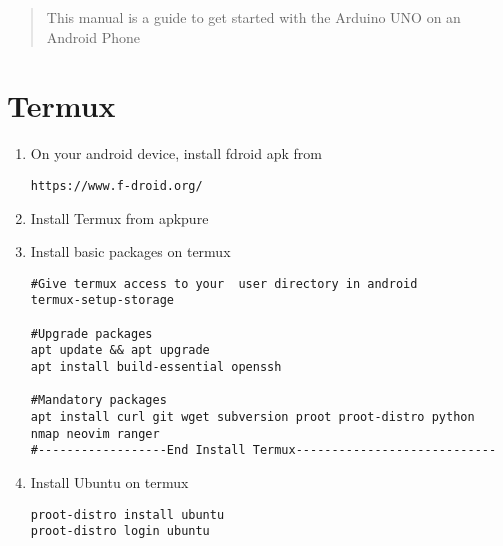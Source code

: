 \documentclass[journal,2pt,twocolumn]{IEEEtran}
\begin{document}
\tableofcontents

\bigskip

\begin{abstract}
This manual is a guide to get started with the Arduino UNO on an Android Phone
\end{abstract}




%
\fi

\section{Termux}
\begin{enumerate}
	\item On your android device, install 
fdroid apk from
%
\begin{lstlisting}
https://www.f-droid.org/
\end{lstlisting}
\item Install Termux from apkpure
\item Install basic packages on termux 
\begin{lstlisting}
#Give termux access to your  user directory in android
termux-setup-storage

#Upgrade packages
apt update && apt upgrade
apt install build-essential openssh

#Mandatory packages
apt install curl git wget subversion proot proot-distro python  nmap neovim ranger
#------------------End Install Termux----------------------------
\end{lstlisting}
\item Install Ubuntu on termux 
\begin{lstlisting}
proot-distro install ubuntu
proot-distro login ubuntu
\end{lstlisting}
\end{enumerate}
\end{document}
